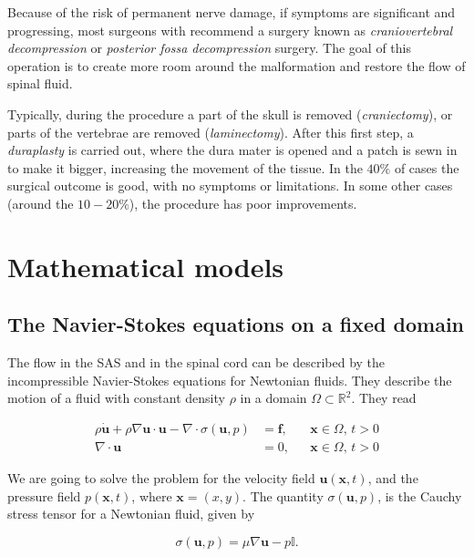 \documentclass[a4paper,11pt,openright,twoside]{book}
\begin{document}
Because of the risk of permanent nerve damage, if symptoms are significant and progressing, most surgeons with recommend a surgery known as \emph{craniovertebral decompression} or \emph{posterior fossa decompression} surgery. The goal of this operation is to create more room around the malformation and restore the flow of spinal fluid. 

Typically, during the procedure a part of the skull is removed (\textit{craniectomy}), or parts of the vertebrae are removed (\textit{laminectomy}). After this first step, a \textit{duraplasty} is carried out, where the dura mater is opened and a patch is sewn in to make it bigger, increasing the movement of the tissue.
In the $40 \%$ of cases the surgical outcome is good, with no symptoms or limitations. In some other cases (around the $10-20 \%$), the procedure has poor improvements. 



\chapter{Mathematical models}

\section{The Navier-Stokes equations on a fixed domain}


The flow in the SAS and in the spinal cord can be described by the incompressible Navier-Stokes equations for Newtonian fluids. They describe the motion of a fluid with constant density $\rho$ in a domain $\Omega \subset \mathbb{R}^2$. They read

\begin{align}
\label{eq:ns:0}
\rho \dot{\mathbf{u}}
+ \rho \nabla \mathbf{u} \cdot \mathbf{u}
- \nabla \cdot \sigma(\mathbf{u},p)
&= \mathbf{f},  && \mathbf{x} \in \Omega, \, t>0 \\
\nabla \cdot \mathbf{u} &= 0, && \mathbf{x} \in \Omega, \, t>0
\end{align}

We are going to solve the problem for the velocity field $\mathbf{u}(\mathbf{x},t)$, and the pressure field $p(\mathbf{x},t)$, where $\mathbf{x} = (x,y)$. The quantity $\sigma(\mathbf{u}, p)$, is the Cauchy stress tensor for a Newtonian fluid, given by

\begin{equation}
\sigma(\mathbf{u}, p) = \mu \nabla \mathbf{u} - p \mathbb{I}.
\end{equation}
\end{document}
